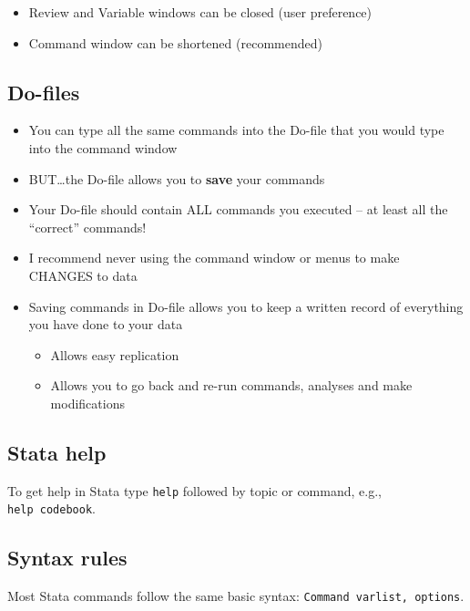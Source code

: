 \documentclass[
]{book}
\providecommand{\tightlist}{%
  \setlength{\itemsep}{0pt}\setlength{\parskip}{0pt}}
\begin{document}
\begin{itemize}
\tightlist
\item
  Review and Variable windows can be closed (user preference)
\item
  Command window can be shortened (recommended)
\end{itemize}

\hypertarget{do-files}{%
\subsection{Do-files}\label{do-files}}

\begin{itemize}
\tightlist
\item
  You can type all the same commands into the Do-file that you would type into the command window
\item
  BUT\ldots the Do-file allows you to \textbf{save} your commands
\item
  Your Do-file should contain ALL commands you executed -- at least all the ``correct'' commands!
\item
  I recommend never using the command window or menus to make CHANGES to data
\item
  Saving commands in Do-file allows you to keep a written record of everything you have done to your data

  \begin{itemize}
  \tightlist
  \item
    Allows easy replication
  \item
    Allows you to go back and re-run commands, analyses and make modifications
  \end{itemize}
\end{itemize}

\hypertarget{stata-help}{%
\subsection{Stata help}\label{stata-help}}

To get help in Stata type \texttt{help} followed by topic or command, e.g., \texttt{help\ codebook}.

\hypertarget{syntax-rules-2}{%
\subsection{Syntax rules}\label{syntax-rules-2}}

Most Stata commands follow the same basic syntax: \texttt{Command\ varlist,\ options}.
\end{document}
